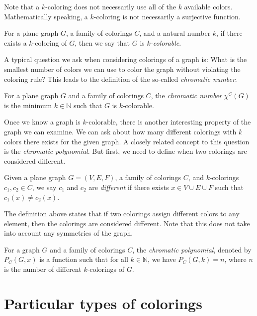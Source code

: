 Note that a $k$-coloring does not necessarily use all of the $k$ available colors. Mathematically speaking, a $k$-coloring is not necessarily a surjective function.

\begin{defn}
    For a plane graph $G$, a family of colorings $C$, and a natural number $k$, if there exists a $k$-coloring of $G$, then we say that $G$ is \emph{$k$-colorable}.
\end{defn}

A typical question we ask when considering colorings of a graph is: What is the smallest number of colors we can use to color the graph without violating the coloring rule? This leads to the definition of the so-called \textit{chromatic number}.


\begin{defn}
    For a plane graph $G$ and a family of colorings $C$, the \emph{chromatic number} $\chi^C(G)$ is the minimum $k \in \mathbb{N}$ such that $G$ is $k$-colorable.
\end{defn}

Once we know a graph is $k$-colorable, there is another interesting property of the graph we can examine. We can ask about how many different colorings with $k$ colors there exists for the given graph. A closely related concept to this question is the \emph{chromatic polynomial}. But first, we need to define when two colorings are considered different.

\begin{defn}
    Given a plane graph $G = (V, E, F)$, a family of colorings $C$, and $k$-colorings $c_1, c_2 \in C$, we say $c_1$ and $c_2$ are \emph{different} if there exists $x \in V \cup E \cup F$ such that $c_1(x) \neq c_2(x)$.
\end{defn}

The definition above states that if two colorings assign different colors to any element, then the colorings are considered different. Note that this does not take into account any symmetries of the graph.

\begin{defn}
    For a graph $G$ and a family of colorings $C$, the \emph{chromatic polynomial}, denoted by $P_C(G,x)$ is a function such that for all $k \in \mathbb{N}$, we have $P_C(G,k) = n$, where $n$ is the number of different $k$-colorings of $G$.
\end{defn}

\section{Particular types of colorings}

